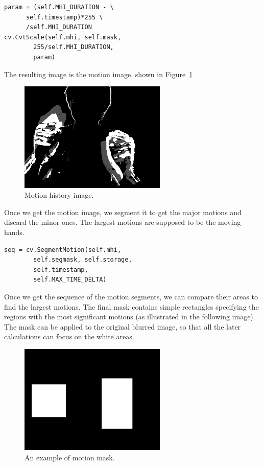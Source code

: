 \documentclass[10pt,twocolumn,letterpaper]{article}
\begin{document}
\begin{verbatim}
param = (self.MHI_DURATION - \
      self.timestamp)*255 \
      /self.MHI_DURATION
cv.CvtScale(self.mhi, self.mask, 
        255/self.MHI_DURATION,
        param)
\end{verbatim}

The resulting image is the motion image, shown in Figure~\ref{fig:motion}
\begin{figure}[h]
\centering
\includegraphics[width=7cm]{motion.png}
\caption{Motion history image.}
\label{fig:motion}
\end{figure}

Once we get the motion image, we segment it to get the major motions 
and discard the minor ones. The largest motions are supposed to be the moving hands.
\begin{verbatim}
seq = cv.SegmentMotion(self.mhi, 
        self.segmask, self.storage, 
        self.timestamp,
        self.MAX_TIME_DELTA) 
\end{verbatim}
Once we get the sequence of the motion segments, we can compare 
their areas to find the largest motions. The final mask 
contains simple rectangles specifying the regions with the most 
significant motions (as illustrated in the following image). The 
mask can be applied to the original blurred image, so that all 
the later calculations can focus on the white areas.
\begin{figure}[h]
\centering
\includegraphics[width=7cm]{block.png}
\caption{An example of motion mask.}
\label{fig:motionmask}
\end{figure}
\end{document}
